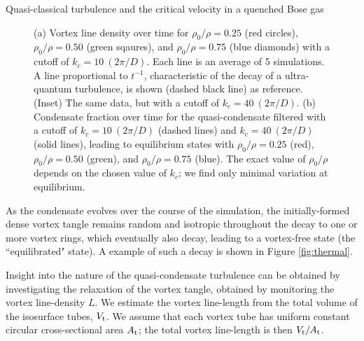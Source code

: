 \begin{chapter}{\label{cha:nonequib}Quasi-classical turbulence and the critical velocity in a quenched Bose gas}
\begin{figure}
\begin{center}
\end{center}
\caption{\label{fig:ll_t} (a) Vortex line density over time for $\rho_0/\rho=0.25$ (red circles), $\rho_0/\rho=0.50$ (green sqaures), and $\rho_0/\rho=0.75$ (blue diamonds) with a cutoff of $k_{c}=10~(2\pi/D)$. Each line is an average of 5 simulations. A line proportional to $t^{-1}$, characteristic of the decay of a ultra-quantum turbulence, is shown (dashed black line) as reference. (Inset) The same data, but with a cutoff of $k_{c}=40~(2\pi/D)$. (b) Condensate fraction over time for the quasi-condensate filtered with a cutoff of $k_{c}=10~(2\pi/D)$ (dashed lines) and $k_{c}=40~(2\pi/D)$ (solid lines), leading to equilibrium states with $\rho_0/\rho=0.25$ (red), $\rho_0/\rho=0.50$ (green), and $\rho_0/\rho=0.75$ (blue). The exact value of $\rho_0/\rho$ depends on the chosen value of $k_c$; we find only minimal variation at equilibrium.}
\end{figure}
As the condensate evolves over the course of the simulation, the initially-formed dense vortex tangle remains random and isotropic throughout the decay to one or more vortex rings, which eventually also decay, leading to a vortex-free state (the ``equilibrated" state). A example of such a decay is shown in Figure \ref{fig:thermal}.

Insight into the nature of the quasi-condensate turbulence can be obtained by investigating the relaxation of the vortex tangle, obtained by monitoring the vortex line-density $L$. We estimate the vortex line-length from the total volume of the isosurface tubes, $V_{\rm t}$. We assume that each vortex tube has uniform constant circular cross-sectional area $A_{\rm t}$; the total vortex line-length is then $V_{\rm t}/A_{\rm t}$.


\end{chapter}
